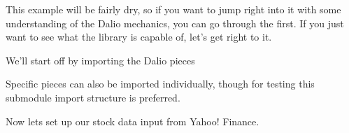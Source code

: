 \documentclass[letterpaper,10pt,english]{sphinxmanual}
\begin{document}
This example will be fairly dry, so if you want to jump right into it with some understanding of the Dal\sphinxhyphen{}io mechanics, you can go through the {\hyperref[\detokenize{beginners-guide:beginners-guide}]{}} first. If you just want to see what the library is capable of, let’s get right to it.

We’ll start off by importing the Dal\sphinxhyphen{}io pieces

\begin{sphinxVerbatim}[commandchars=\\\{\}]
   

   
   
   
   
   
\end{sphinxVerbatim}

Specific pieces can also be imported individually, though for testing this sub\sphinxhyphen{}module import structure is preferred.

Now lets set up our stock data input from Yahoo! Finance.

\begin{sphinxVerbatim}[commandchars=\\\{\}]
  \PYG{p}{[}      \PYG{p}{]}

  \PYGZbs{}
\end{sphinxVerbatim}
\end{document}
